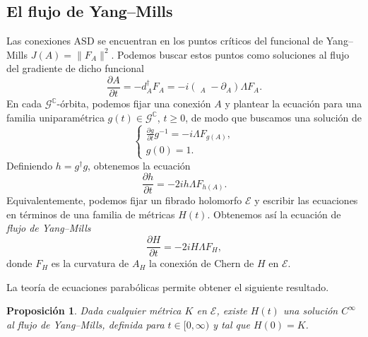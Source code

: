 \documentclass[12pt, a4paper]{amsart}
\newcommand\CC{\mathbb{C}}
\newcommand\GG{\mathcal{G}}
\newcommand\EE{\mathscr{E}}
\DeclareMathOperator\delbar{\bar{\partial}}
\newtheorem{prop}[thm]{Proposición}
\theoremstyle{remark} \newtheorem{rmk}[thm]{Observación}
\theoremstyle{remark} \newtheorem{rmks}[thm]{Observaciones}
\theoremstyle{definition} \newtheorem{defn}[thm]{Definición}
\theoremstyle{definition} \newtheorem{ejs}[thm]{Ejemplos}
\theoremstyle{definition} \newtheorem{ej}[thm]{Ejemplo}
\begin{document}
\subsection{El flujo de Yang--Mills} Las conexiones ASD se encuentran en los puntos críticos del funcional de Yang--Mills $J(A)=\lVert F_A \rVert^2$. Podemos buscar estos puntos como soluciones al flujo del gradiente de dicho funcional
\begin{equation*}
	\frac{\partial A}{\partial t} = -d_A^\dagger F_A= -i (\delbar_A - \partial_A)\Lambda F_A.
\end{equation*} 
En cada $\GG^\CC$-órbita, podemos fijar una conexión $A$ y plantear la ecuación para una familia uniparamétrica  $g(t)\in \GG^\CC$, $t\geq 0$, de modo que buscamos una solución de
 \begin{equation*}
\begin{cases}
	\frac{\partial g}{\partial t} g^{-1}=-i\Lambda F_{g(A)}, \\
	g(0)=1.
\end{cases}
\end{equation*} 
Definiendo $h=g^\dagger g$, obtenemos la ecuación
 \begin{equation*}
	 \frac{\partial h}{\partial t}=-2ih \Lambda F_{h(A)}.
\end{equation*} 
Equivalentemente, podemos fijar un fibrado holomorfo $\EE$ y escribir las ecuaciones en términos de una familia de métricas $H(t)$. Obtenemos así la ecuación de \emph{flujo de Yang--Mills}
\begin{equation*}
	\frac{\partial H}{\partial t} = -2iH \Lambda F_{H},
\end{equation*} 
donde $F_H$ es la curvatura de $A_H$ la conexión de Chern de $H$ en $\EE$.

La teoría de ecuaciones parabólicas permite obtener el siguiente resultado.

\begin{prop}
	Dada cualquier métrica $K$ en $\EE$, existe $H(t)$ una solución $C^\infty$ al flujo de Yang--Mills, definida para $t\in [0,\infty)$ y tal que $H(0)=K$.
\end{prop}
\end{document}
